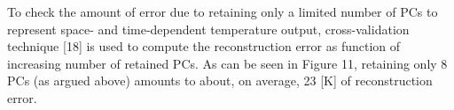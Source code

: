 \documentclass[11pt,titlepage]{article}
\begin{document}

To check the amount of error due to retaining only a limited number of PCs to represent space- and time-dependent temperature output, cross-validation technique [18] is used to compute the reconstruction error as function of increasing number of retained PCs. As can be seen in Figure 11, retaining only 8 PCs (as argued above) amounts to about, on average, 23 [K] of reconstruction error.


\end{document}

